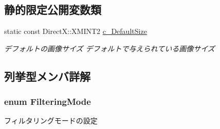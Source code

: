 \subsection*{静的限定公開変数類}
\begin{DoxyCompactItemize}
\item 
static const Direct\+X\+::\+X\+M\+I\+N\+T2 \hyperlink{class_a_p_i_1_1abstract_ab4133323b5c23ce2ace79e33c0f99734}{c\+\_\+\+Default\+Size}\hypertarget{class_a_p_i_1_1abstract_ab4133323b5c23ce2ace79e33c0f99734}{}\label{class_a_p_i_1_1abstract_ab4133323b5c23ce2ace79e33c0f99734}

\begin{DoxyCompactList}\small\item\em デフォルトの画像サイズ  デフォルトで与えられている画像サイズ \end{DoxyCompactList}\end{DoxyCompactItemize}


\subsection{列挙型メンバ詳解}
\subsubsection[{\texorpdfstring{Filtering\+Mode}{FilteringMode}}]{\setlength{\rightskip}{0pt plus 5cm}enum {\bf Filtering\+Mode}}\hypertarget{class_a_p_i_1_1abstract_a520ef65de715096fdca5c71afa9273a1}{}\label{class_a_p_i_1_1abstract_a520ef65de715096fdca5c71afa9273a1}


フィルタリングモードの設定 

